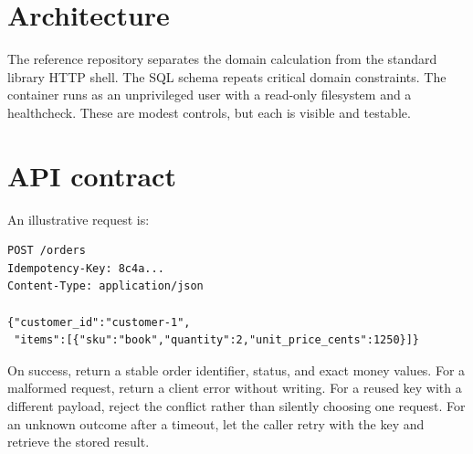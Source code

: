 \section{Architecture}
\begin{center}
\end{center}

The reference repository separates the domain calculation from the standard
library HTTP shell. The SQL schema repeats critical domain constraints. The
container runs as an unprivileged user with a read-only filesystem and a
healthcheck. These are modest controls, but each is visible and testable.

\section{API contract}
An illustrative request is:

\begin{lstlisting}[language={},caption={The body is a data contract, not a Python object.}]
POST /orders
Idempotency-Key: 8c4a...
Content-Type: application/json

{"customer_id":"customer-1",
 "items":[{"sku":"book","quantity":2,"unit_price_cents":1250}]}
\end{lstlisting}

On success, return a stable order identifier, status, and exact money values.
For a malformed request, return a client error without writing. For a reused
key with a different payload, reject the conflict rather than silently choosing
one request. For an unknown outcome after a timeout, let the caller retry with
the key and retrieve the stored result.


